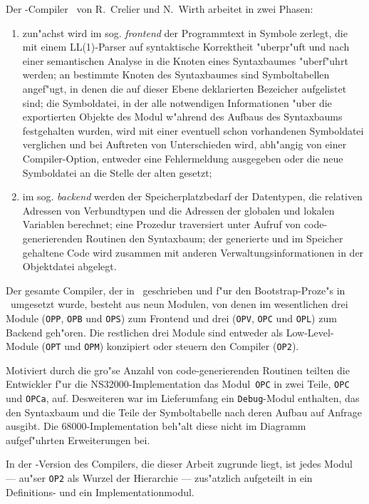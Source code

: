 Der \oberon-Compiler \OP\ von R.~Crelier und N.~Wirth arbeitet in zwei
Phasen:
\begin{enumerate}
\item zun"achst wird im sog. {\em frontend\/} der Programmtext in
  Symbole zerlegt, die mit einem LL(1)-Parser auf syntaktische Korrektheit
  "uberpr"uft und nach einer semantischen Analyse in die Knoten eines
  Syntaxbaumes "uberf"uhrt werden; an bestimmte Knoten des Syntaxbaumes sind
  Symboltabellen angef"ugt, in denen die auf dieser Ebene deklarierten
  Bezeicher aufgelistet sind;
  die Symboldatei, in der alle notwendigen Informationen "uber die exportierten
  Objekte des Modul w"ahrend des Aufbaus des Syntaxbaums festgehalten wurden,
  wird mit einer eventuell schon vorhandenen Symboldatei verglichen und bei
  Auftreten von Unterschieden wird, abh"angig von einer Compiler-Option,
  entweder eine Fehlermeldung ausgegeben oder die neue Symboldatei an die Stelle der
  alten gesetzt;
\item im sog. {\em backend\/} werden der Speicherplatzbedarf der Datentypen,
  die relativen Adressen von Verbundtypen und die Adressen der globalen und
  lokalen Variablen berechnet; eine Prozedur traversiert unter Aufruf von
  code-generierenden Routinen den Syntaxbaum; der generierte und im Speicher
  gehaltene Code wird zusammen mit anderen Verwaltungsinformationen in der
  Objektdatei abgelegt.
\end{enumerate}

Der gesamte Compiler, der in \oberon\ geschrieben und f"ur den Bootstrap-Proze"s
in \modula\ umgesetzt wurde, besteht aus neun Modulen,
von denen im wesentlichen drei Module ({\tt OPP}, {\tt OPB} und {\tt OPS})
zum Frontend und drei ({\tt OPV}, {\tt OPC} und {\tt OPL}) zum Backend
geh"oren.
Die restlichen drei Module sind entweder als Low-Level-Module ({\tt OPT} und
{\tt OPM}) konzipiert oder steuern den Compiler ({\tt OP2}).

Motiviert durch die gro"se Anzahl von code-generierenden Routinen teilten
die Entwickler f"ur die NS32000-Implementation das Modul~{\tt OPC} in zwei
Teile, {\tt OPC} und {\tt OPCa}, auf.
Desweiteren war im Lieferumfang ein {\tt Debug}-Modul enthalten, das den
Syntaxbaum und die Teile der Symboltabelle nach deren Aufbau auf Anfrage
ausgibt.
Die 68000-Implementation beh"alt diese nicht im Diagramm aufgef"uhrten Erweiterungen
bei.

In der \modula-Version des Compilers, die dieser Arbeit zugrunde liegt,
ist jedes Modul --- au"ser {\tt OP2} als Wurzel der Hierarchie ---
zus"atzlich aufgeteilt in ein Definitions- und ein Implementationmodul.

